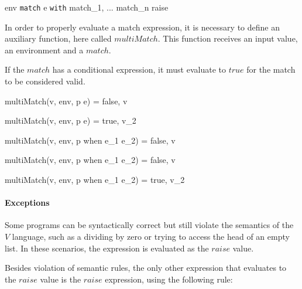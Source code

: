\documentclass{article}
\begin{document}
    {\mbox{env} \vdash \texttt{match} \; e \; \texttt{with} \; match_1, ... \; match_n \Downarrow raise}

\medskip

In order to properly evaluate a match expression, it is necessary to define an auxiliary function, here called $multiMatch$.
This function receives an input value, an environment and a $match$.

If the $match$ has a conditional expression, it must evaluate to $true$ for the match to be considered valid.

  {multiMatch(v, \mbox{env}, p \rightarrow e) = false, v}

  {multiMatch(v, \mbox{env}, p \rightarrow e) = true, v_2}

  {multiMatch(v, \mbox{env}, p \; \mbox{when} \; e_1 \rightarrow e_2) = false, v}

  {multiMatch(v, \mbox{env}, p \; \mbox{when} \; e_1 \rightarrow e_2) = false, v}

  {multiMatch(v, \mbox{env}, p \; \mbox{when} \; e_1 \rightarrow e_2) = true, v_2}

\paragraph{Exceptions}

Some programs can be syntactically correct but still violate the semantics of the $V$ language, such as a dividing by zero or trying to access the head of an empty list.
In these scenarios, the expression is evaluated as the $raise$ value.

Besides violation of semantic rules, the only other expression that evaluates to the $raise$ value is the $raise$ expression, using the following rule:

\end{document}
